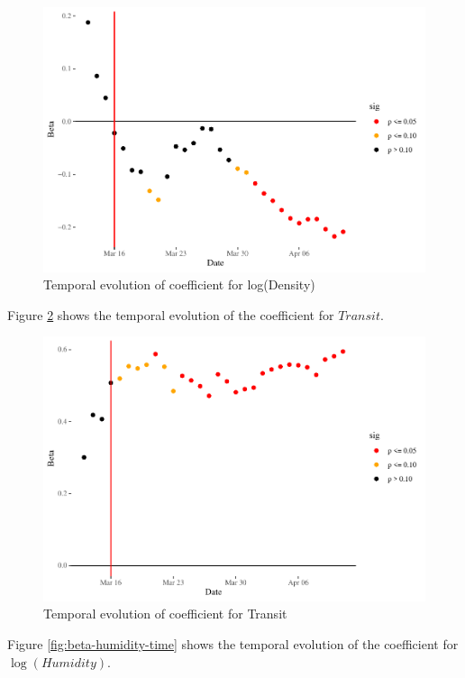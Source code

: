 \documentclass[]{elsarticle} %
\makeatletter
\def\maxwidth{\ifdim\Gin@nat@width>\linewidth\linewidth
\else\Gin@nat@width\fi}
\let\Oldincludegraphics\includegraphics
\renewcommand{\includegraphics}[1]{\Oldincludegraphics[width=\maxwidth]{#1}}
\makeatother
\begin{document}
\begin{figure}
\centering
\includegraphics{Environmental-Correlates-of-COVID19-Spain_files/figure-latex/beta-density-time-1.pdf}
\caption{\label{fig:beta-density-time}Temporal evolution of coefficient
for log(Density)}
\end{figure}

Figure \ref{fig:beta-transit-time} shows the temporal evolution of the
coefficient for \(Transit\).

\begin{figure}
\centering
\includegraphics{Environmental-Correlates-of-COVID19-Spain_files/figure-latex/beta-transit-time-1.pdf}
\caption{\label{fig:beta-transit-time}Temporal evolution of coefficient
for Transit}
\end{figure}

Figure \ref{fig:beta-humidity-time} shows the temporal evolution of the
coefficient for \(\log(Humidity)\).
\end{document}
